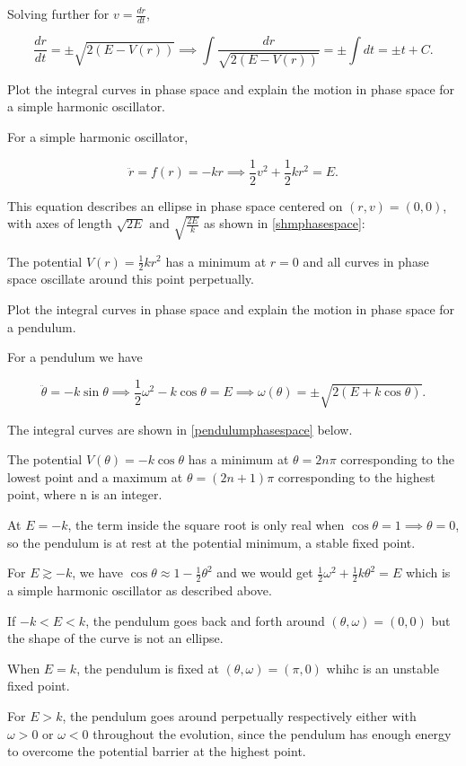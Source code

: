 \documentclass[english,a4paper,12pt]{report}
\begin{document}
Solving further for \(v = \frac{dr}{dt} \), 

\begin{equation}
    \frac{dr}{dt} = \pm \sqrt{2(E-V(r))} \implies \int \frac{dr}{\sqrt{2(E-V(r))} } = \pm \int dt = \pm t + C. 
\end{equation}

{Plot the integral curves in phase space and explain the motion in phase space for a simple harmonic oscillator.}
{For a simple harmonic oscillator,

\begin{equation}
    \ddot{r} = f(r) = -kr \implies  \frac{1}{2}v^2 + \frac{1}{2}kr^2 = E . 
\end{equation}

This equation describes an ellipse in phase space centered on \((r,v) = (0,0)\), with axes of length \(\sqrt{2E} \text { and } \sqrt{\frac{2E}{k} }  \) as shown in \cref{shmphasespace}:

The potential \(V(r) = \frac{1}{2} kr^2 \) has a minimum at \(r=0\) and all curves in phase space oscillate around this point perpetually.  
} 

{Plot the integral curves in phase space and explain the motion in phase space for a pendulum.}
{For a pendulum we have

\begin{equation}
    \ddot{\theta } = -k\sin \theta \implies \frac{1}{2}\omega ^2-k\cos \theta = E \implies \omega (\theta ) = \pm \sqrt{2(E+k\cos \theta )}.   
\end{equation}

The integral curves are shown in \cref{pendulumphasespace} below.

The potential \(V(\theta ) = -k\cos \theta \) has a minimum at \(\theta = 2n\pi \) corresponding to the lowest point and a maximum at \(\theta = (2n+1)\pi \) corresponding to the highest point, where n is an integer. 

At \(E = -k\), the term inside the square root is only real when \(\cos \theta = 1 \implies \theta = 0\), so the pendulum is at rest at the potential minimum, a stable fixed point. 

For \(E \gtrsim -k\), we have \(\cos \theta \approx 1-\frac{1}{2}\theta ^2 \) and we would get \(\frac{1}{2}\omega ^2 + \frac{1}{2}k \theta ^2 = E  \) which is a simple harmonic oscillator as described above. 

If \(-k < E < k\), the pendulum goes back and forth around \((\theta ,\omega ) = (0,0)\) but the shape of the curve is not an ellipse.

When \(E = k\), the pendulum is fixed at \((\theta ,\omega ) = (\pi ,0)\) whihc is an unstable fixed point.

For \(E>k\), the pendulum goes around perpetually respectively either with \(\omega > 0 \text { or } \omega <0\) throughout the evolution, since the pendulum has enough energy to overcome the potential barrier at the highest point.


} 
\end{document}
